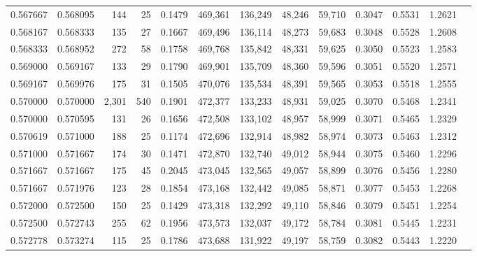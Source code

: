 \begin{tabular}{rrrrrrrrrrrrr}
0.567667 & 0.568095 &   144 &  25 &                                     0.1479 & 469,361 & 136,249 &  48,246 &  59,710 & 0.3047 & 0.5531 & 1.2621 \\
0.568167 & 0.568333 &   135 &  27 &                                     0.1667 & 469,496 & 136,114 &  48,273 &  59,683 & 0.3048 & 0.5528 & 1.2608 \\
0.568333 & 0.568952 &   272 &  58 &                                     0.1758 & 469,768 & 135,842 &  48,331 &  59,625 & 0.3050 & 0.5523 & 1.2583 \\
0.569000 & 0.569167 &   133 &  29 &                                     0.1790 & 469,901 & 135,709 &  48,360 &  59,596 & 0.3051 & 0.5520 & 1.2571 \\
0.569167 & 0.569976 &   175 &  31 &                                     0.1505 & 470,076 & 135,534 &  48,391 &  59,565 & 0.3053 & 0.5518 & 1.2555 \\
0.570000 & 0.570000 & 2,301 & 540 &                                     0.1901 & 472,377 & 133,233 &  48,931 &  59,025 & 0.3070 & 0.5468 & 1.2341 \\
0.570000 & 0.570595 &   131 &  26 &                                     0.1656 & 472,508 & 133,102 &  48,957 &  58,999 & 0.3071 & 0.5465 & 1.2329 \\
0.570619 & 0.571000 &   188 &  25 &                                     0.1174 & 472,696 & 132,914 &  48,982 &  58,974 & 0.3073 & 0.5463 & 1.2312 \\
0.571000 & 0.571667 &   174 &  30 &                                     0.1471 & 472,870 & 132,740 &  49,012 &  58,944 & 0.3075 & 0.5460 & 1.2296 \\
0.571667 & 0.571667 &   175 &  45 &                                     0.2045 & 473,045 & 132,565 &  49,057 &  58,899 & 0.3076 & 0.5456 & 1.2280 \\
0.571667 & 0.571976 &   123 &  28 &                                     0.1854 & 473,168 & 132,442 &  49,085 &  58,871 & 0.3077 & 0.5453 & 1.2268 \\
0.572000 & 0.572500 &   150 &  25 &                                     0.1429 & 473,318 & 132,292 &  49,110 &  58,846 & 0.3079 & 0.5451 & 1.2254 \\
0.572500 & 0.572743 &   255 &  62 &                                     0.1956 & 473,573 & 132,037 &  49,172 &  58,784 & 0.3081 & 0.5445 & 1.2231 \\
0.572778 & 0.573274 &   115 &  25 &                                     0.1786 & 473,688 & 131,922 &  49,197 &  58,759 & 0.3082 & 0.5443 & 1.2220 \\

\end{tabular}
